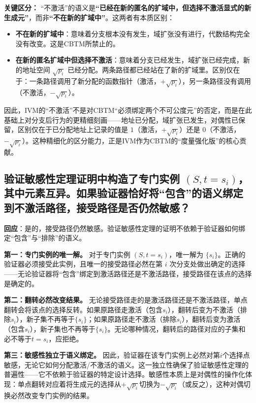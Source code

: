 \documentclass{ctexart}
\begin{document}
	\textbf{关键区分：} ``不激活''的语义是\textbf{``已经在新的匿名的扩域中，但选择不激活显式的新生成元''}，而非\textbf{``不在新的扩域中''}。这两者有本质区别：
	\begin{itemize}
		\item \textbf{不在新的扩域中}：意味着分支根本没有发生，域扩张没有进行，代数结构完全没有改变。这是CBTM所禁止的。
		\item \textbf{在新的匿名扩域中但选择不激活}：意味着分支已经发生，域扩张已经完成，新的地址空间 $\sqrt{p_i}$ 已经分配。两条路径都已经站在了新的扩域里。区别仅在于：一条路径调用了新分配的函数指针（激活，$+\sqrt{p_i}$），另一条路径没有调用（不激活，$-\sqrt{p_i}$）。
	\end{itemize}
	
	因此，IVM的``不激活''不是对CBTM``必须绑定两个不可公度元''的否定，而是在此基础上对分支后行为的更精细刻画——地址已分配，域扩张已发生，对偶性已保留，区别仅在于已分配地址上记录的值是 $1$（激活，$+\sqrt{p_i}$）还是 $0$（不激活，$-\sqrt{p_i}$）。这种精细化的区分能力，正是IVM作为CBTM的``度量强化版''的核心贡献。
	
	
	\subsection{验证敏感性定理证明中构造了专门实例 $(S, t=s_i)$，其中元素互异。如果验证器恰好将``包含''的语义绑定到不激活路径，接受路径是否仍然敏感？}
	
	\textbf{回应}：是的，接受路径仍然敏感。验证敏感性定理的证明不依赖于验证器如何绑定``包含''与``排除''的语义。
	
	\textbf{第一：专门实例的唯一解。} 对于专门实例 $(S, t=s_i)$，唯一解为 $\{s_i\}$。正确的验证器必须接受此实例，且唯一的接受路径必然在第 $i$ 次分支处做出确定的选择——无论验证器将``包含''绑定到激活路径还是不激活路径，接受路径在该点的选择是确定的。
	
	\textbf{第二：翻转必然改变结果。} 无论接受路径走的是激活路径还是不激活路径，单点翻转会将该点的选择反转。如果原路径走激活（包含$s_i$），翻转后变为不激活（排除$s_i$），新子集不再等于$\{s_i\}$；如果原路径走不激活（排除$s_i$），翻转后变为激活（包含$s_i$），新子集也不再等于$\{s_i\}$。无论哪种情况，翻转后的路径对应的子集和必不等于$t=s_i$，应拒绝。
	
	\textbf{第三：敏感性独立于语义绑定。} 因此，验证器在该专门实例上必然对第$i$个选择点敏感，无论它如何分配激活/不激活的语义。这一独立性确保了验证敏感性定理的普遍性——它不依赖于验证器的特定设计选择。敏感性本质上是对偶性的操作化体现：单点翻转对应着将生成元的选择从$+\sqrt{p_i}$切换为$-\sqrt{p_i}$（或反之），这种对偶切换必然改变专门实例的结果。
	
\end{document}
